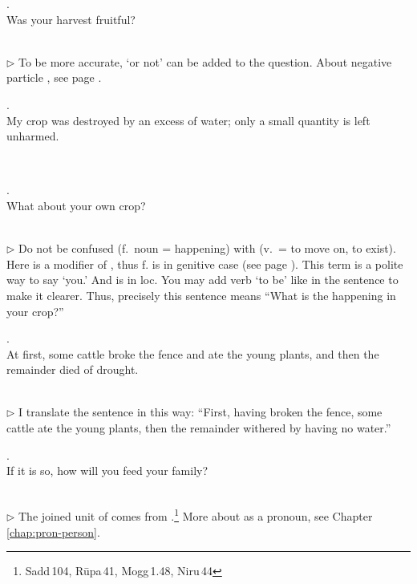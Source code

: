 \medskip
\parbox[lt]{0.93\linewidth}{\raggedright{}. \\
\hspace*{6mm}Was your harvest fruitful?}\\[1mm]
{\small $\triangleright$ To be more accurate, `or not' can be added to the question. About negative particle , see page \pageref{nip:no}.}

\medskip
\parbox[lt]{0.93\linewidth}{\raggedright{}. \\
\hspace*{6mm}My crop was destroyed by an excess of water; only a small quantity is left unharmed.}\\

\medskip
\parbox[lt]{0.93\linewidth}{\raggedright{}. \\
\hspace*{6mm}What about your own crop?}\\[1mm]
{\small $\triangleright$ Do not be confused  (f.\ noun = happening) with  (v.\ = to move on, to exist). Here  is a modifier of , thus f.  is in genitive case (see page \pageref{decl:bhavanta}). This term is a polite way to say `you.' And  is in loc. You may add verb `to be' like  in the sentence to make it clearer. Thus, precisely this sentence means ``What is the happening in your crop?''}

\medskip
\parbox[lt]{0.93\linewidth}{\raggedright{}. \\
\hspace*{6mm}At first, some cattle broke the fence and ate the young plants, and then the remainder died of drought.}\\[1mm]
{\small $\triangleright$ I translate the sentence in this way: ``First, having broken the fence, some cattle ate the young plants, then the remainder withered by having no water.''}

\medskip
\parbox[lt]{0.93\linewidth}{\raggedright{}. \\
\hspace*{6mm}If it is so, how will you feed your family?}\\[1mm]
{\small $\triangleright$ The joined unit of  comes from .\footnote{Sadd\,104, R\=upa\,41, Mogg\,1.48, Niru\,44} More about  as a pronoun, see Chapter \ref{chap:pron-person}.}


